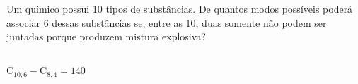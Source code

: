 \begin{ex}
Um químico possui 10 tipos de substâncias. De quantos modos possíveis poderá associar 6 dessas substâncias se, entre as 10, duas somente não podem ser juntadas porque produzem mistura explosiva?
 \begin{sol}
     \phantom{A}\\
     $\mathrm{C}_{{10},6}-\mathrm{C}_{8,4}=140$
    \end{sol}
\end{ex}
